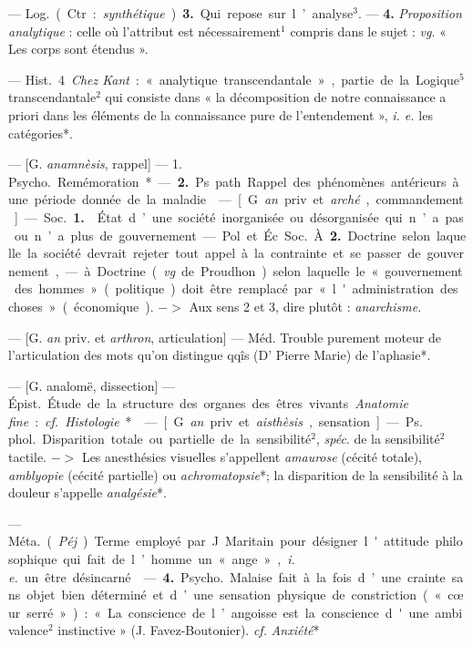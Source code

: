 \begin{itemize}[leftmargin=1cm, label=, itemsep=1pt]
{{{— \si{Log.} (Ctr. : {\it synthétique}). {\bf 3.} Qui
repose sur l’analyse$^3$. — {\bf 4.} {\it Proposition analytique} : celle où l’attribut
est nécessairement$^1$ compris dans le
sujet : {\it vg}. « Les corps sont étendus ».

— \si{Hist.} 4 {\it Chez Kant} : « analytique transcendantale », partie de
la Logique$^5$ transcendantale$^2$ qui
consiste dans « la décomposition de
notre connaissance a priori dans les
éléments de la connaissance pure de
l’entendement », {\it i. e.} les catégories*.

 — [G. {\it anamnèsis}, rappel] —
1. \si{Psycho.} Remémoration*. — {\bf 2.} Ps.
path. Rappel des phénomènes antérieurs à une période donnée de la
maladie.

 — [G. {\it an} priv. et {\it arché}, commandement] — \si{Soc.} {\bf 1.}  État
d’une société inorganisée ou désorganisée qui n’a pas ou n’a plus de
gouvernement.

— Pol. et Éc. \si{Soc.} À {\bf 2.} Doctrine
selon laquelle la société devrait
rejeter tout appel à la contrainte et
se passer de gouvernement, — à.
Doctrine ({\it vg}. de Proudhon) selon
laquelle le « gouvernement des
hommes » (politique) doit être remplacé par « l'administration des
choses » (économique). $->$ Aux
sens 2 et 3, dire plutôt : {\it anarchisme}.

 — [G. {\it an} priv. et {\it arthron},
articulation] — Méd. Trouble purement moteur de l'articulation des
mots qu’on distingue qqîs (D' Pierre
Marie) de l’aphasie*.

 — [G. analomë, dissection]
— \si{Épist.} Étude de la structure des
organes des êtres vivants. {\it Anatomie
fine} : {\it cf.}  {\it Histologie}*.

 — [G. {\it an} priv. et {\it aisthèsis},
sensation] — \si{Ps. phol.} Disparition
totale ou partielle de la sensibilité$^2$,
{\it spéc}. de la sensibilité$^2$ tactile. $->$
Les anesthésies visuelles s’appellent
{\it amaurose} (cécité totale), {\it amblyopie}
(cécité partielle) ou {\it achromatopsie}*;
la disparition de la sensibilité à la
douleur s’appelle {\it analgésie}*.

 — \si{Méta.} ({\it Péj}.) Terme
employé par J. Maritain pour désigner l'attitude philosophique qui
fait de l’homme un « ange », {\it i. e.} un
être désincarné.

 — {\bf 4.} \si{Psycho.} Malaise fait à
la fois d’une crainte sans objet bien
déterminé et d’une sensation physique de constriction (« cœur serré ») :
« La conscience de l’angoisse est la
conscience d'une ambivalence$^2$ instinctive » (J. Favez-Boutonier). {\it cf.} 
{\it Anxiété}*

}}}
\end{itemize}
